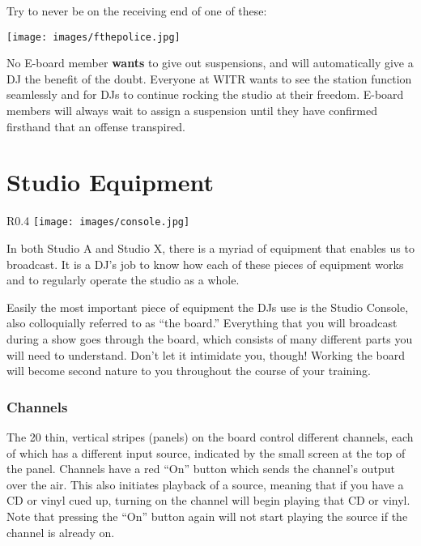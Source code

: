 \documentclass{witrman}
\begin{document}
Try to never be on the receiving end of one of these:

\begin{center}
    \texttt{[image: images/fthepolice.jpg]}
\end{center}

No E-board member \textbf{wants} to give out suspensions, and will automatically
give a DJ the benefit of the doubt.  Everyone at WITR wants to see the station
function seamlessly and for DJs to continue rocking the studio at their freedom.
E-board members will always wait to assign a suspension until they have
confirmed firsthand that an offense transpired.


\chapter{Studio Equipment}

\begin{wrapfigure}{R}{0.4\linewidth}
    \centering
    \texttt{[image: images/console.jpg]}
\end{wrapfigure}

In both Studio A and Studio X, there is a myriad of equipment that enables us to
broadcast.  It is a DJ's job to know how each of these pieces of equipment works
and to regularly operate the studio as a whole.

Easily the most important piece of equipment the DJs use is the Studio Console,
also colloquially referred to as ``the board.''  Everything that you will
broadcast during a show goes through the board, which consists of many different
parts you will need to understand.  Don't let it intimidate you, though!
Working the board will become second nature to you throughout the course of your
training.

\subsection{Channels}

The 20 thin, vertical stripes (panels) on the board control different channels,
each of which has a different input source, indicated by the small screen at the
top of the panel.  Channels have a red ``On'' button which sends the channel's
output over the air.  This also initiates playback of a source, meaning that if
you have a CD or vinyl cued up, turning on the channel will begin playing that
CD or vinyl.  Note that pressing the ``On'' button again will not start playing
the source if the channel is already on.
\end{document}
